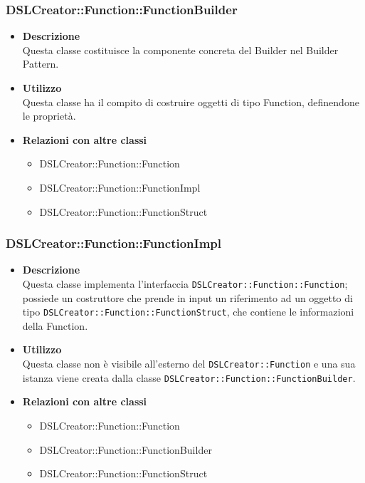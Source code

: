  \subsubsection{DSLCreator::Function::FunctionBuilder}
                    \begin{itemize}
                        \item \textbf{Descrizione} \hfill \\
                          Questa classe costituisce la componente concreta del Builder nel Builder Pattern.
                        \item \textbf{Utilizzo} \hfill \\
                          Questa classe ha il compito di costruire oggetti di tipo Function, definendone le proprietà.
                        \item \textbf{Relazioni con altre classi}
                            \begin{itemize}
                              \item DSLCreator::Function::Function
                              \item DSLCreator::Function::FunctionImpl
                              \item DSLCreator::Function::FunctionStruct
                            \end{itemize}
                    \end{itemize}  

 \subsubsection{DSLCreator::Function::FunctionImpl}
                    \begin{itemize}
                        \item \textbf{Descrizione} \hfill \\
                          Questa classe implementa l'interfaccia \texttt{DSLCreator::Function::Function}; possiede un costruttore che prende in input un riferimento ad un oggetto di tipo \texttt{DSLCreator::Function::FunctionStruct}, che contiene le informazioni della Function.
                        \item \textbf{Utilizzo} \hfill \\
                          Questa classe non è visibile all'esterno del  \texttt{DSLCreator::Function} e una sua istanza viene creata dalla classe \texttt{DSLCreator::Function::FunctionBuilder}.
                        \item \textbf{Relazioni con altre classi}
                            \begin{itemize}
                              \item DSLCreator::Function::Function
                              \item DSLCreator::Function::FunctionBuilder
                              \item DSLCreator::Function::FunctionStruct
                            \end{itemize}
                    \end{itemize}  


